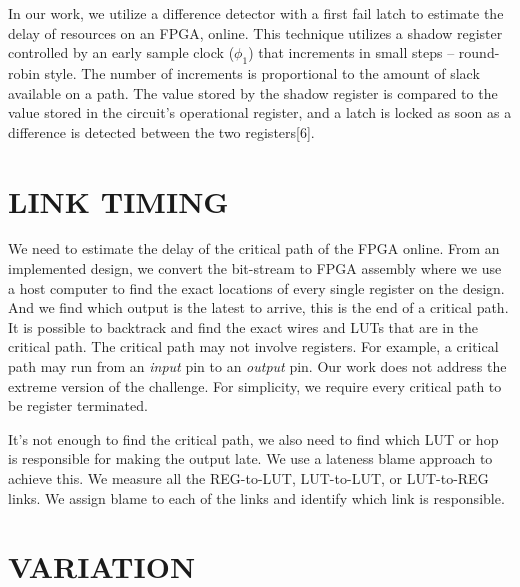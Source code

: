 \documentclass[11pt]{report}
\begin{document}
\begin{mainf}
In our work, we utilize a difference detector with a first fail latch to estimate the delay of resources on an FPGA, online. This technique utilizes a shadow register controlled by an early sample clock ($\phi_1$) that increments in small steps -- round-robin style. The number of increments is proportional to the amount of slack available on a path. The value stored by the shadow register is compared to the value stored in the circuit's operational register, and a latch is locked as soon as a difference is detected between the two registers[6]. 

\section{\textbf{LINK TIMING}}
We need to estimate the delay of the critical path of the FPGA online. From an implemented design, we convert the bit-stream to FPGA assembly where we use a host computer to find the exact locations of every single register on the design. And we find which output is the latest to arrive, this is the end of a critical path. It is possible to backtrack and find the exact wires and LUTs that are in the critical path. The critical path may not involve registers. For example, a critical path may run from an \textit{input} pin to an \textit{output} pin. Our work does not address the extreme version of the challenge. For simplicity, we require every critical path to be register terminated. 

It's not enough to find the critical path, we also need to find which LUT or hop is responsible for making the output late. We use a lateness blame approach to achieve this. We measure all the REG-to-LUT, LUT-to-LUT, or LUT-to-REG links. We assign blame to each of the links and identify which link is responsible. 


\section{\textbf{VARIATION}}


\end{mainf}
\end{document}
